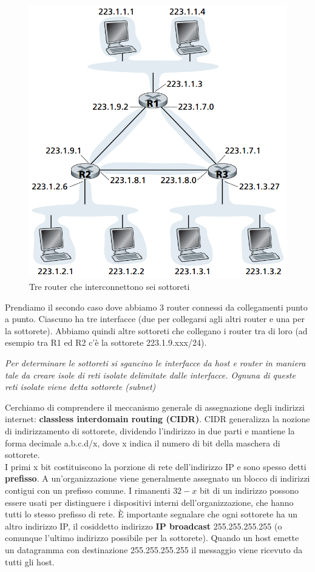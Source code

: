 \documentclass[11pt,a4paper]{article}
\begin{document}
\begin{figure}
	\includegraphics[scale=0.6]{img/055.png}
	\caption{Tre router che interconnettono sei sottoreti}
\end{figure}
Prendiamo il secondo caso dove abbiamo 3 router connessi da collegamenti punto a punto. Ciascuno ha tre interfacce (due per collegarsi agli altri router e una per la sottorete). Abbiamo quindi altre sottoreti che collegano i router tra di loro (ad esempio tra R1 ed R2 c'è la sottorete 223.1.9.xxx/24).
\begin{center}
	\textit{Per determinare le sottoreti si sgancino le interfacce da host e router in maniera tale da creare isole di reti isolate delimitate dalle interfacce. Ognuna di queste reti isolate viene detta sottorete (subnet)}
\end{center}
Cerchiamo di comprendere il meccanismo generale di assegnazione degli indirizzi internet: \textbf{classless interdomain routing (CIDR)}. CIDR generalizza la nozione di indirizzamento di sottorete, dividendo l'indirizzo in due parti e mantiene la forma decimale a.b.c.d/x, dove x indica il numero di bit della maschera di sottorete. \\
I primi x bit costituiscono la porzione di rete dell'indirizzo IP e sono spesso detti \textbf{prefisso}. A un'organizzazione viene generalmente assegnato un blocco di indirizzi contigui con un prefisso comune. I rimanenti $32-x$ bit di un indirizzo possono essere usati per distinguere i dispositivi interni dell'organizzazione, che hanno tutti lo stesso prefisso di rete. È importante segnalare che ogni sottorete ha un altro indirizzo IP, il cosiddetto indirizzo \textbf{IP broadcast} 255.255.255.255 (o comunque l'ultimo indirizzo possibile per la sottorete). Quando un host emette un datagramma con destinazione 255.255.255.255 il messaggio viene ricevuto da tutti gli host.
\end{document}
